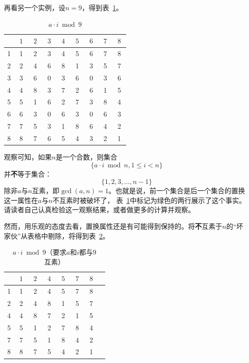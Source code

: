 再看另一个实例，设$n = 9$，得到表~\ref{tab:ai_mod_9}。
	\begin{table}[htbp]
		\centering
		\begin{tabular}{ | c | c | c | c | c | c | c | c | c | }
			\hline
			\diagbox{$a$}{$a \cdot i \;$}{$i \;$}  & $\; 1 \;$ & $\; 2 \;$ & $\; 3 \;$ & $\; 4 \;$ & $\; 5 \;$ & $\; 6 \;$ & $\; 7 \;$ & $\; 8 \;$  \\ \hline
			1 & 1 & 2 & 3 & 4 & 5 & 6 & 7 & 8 \\ \hline
			2 & 2 & 4 & 6 & 8 & 1  & 3 & 5 & 7 \\ \hline
			\rowcolor{green}  3 & 3 & 6 & 0 & 3 & 6 & 0 & 3 & 6 \\ \hline
			4 & 4 & 8 & 3 & 7 & 2 & 6 & 1 & 5 \\ \hline
			5 & 5 & 1 & 6  & 2  & 7 & 3 & 8 & 4 \\ \hline
			\rowcolor{green}  6 & 6 & 3 & 0 & 6 & 3 & 0 & 6 & 3 \\ \hline
			7 & 7 & 5 & 3 & 1 & 8 & 6 & 4 & 2 \\ \hline
			8 & 8 & 7  & 6  & 5  & 4 & 3 & 2 & 1 \\
			\hline
		\end{tabular}
		\caption{$a \cdot i \bmod 9$}
		\label{tab:ai_mod_9}
	\end{table}

观察可知，如果$n$是一个合数，则集合
\[\{ a \cdot i \bmod n, 1 \leq i < n \}\]
并\textbf{不}等于集合：
\[\{1, 2, 3, \ldots, n-1\}\]
除非$a$与$n$互素，即$\gcd(a,n)=1$。也就是说，前一个集合是后一个集合的置换这一属性在$a$与$n$不互素时被破坏了，
表~\ref{tab:ai_mod_9}中标记为绿色的两行展示了这个事实。请读者自己认真检验这一观察结果，或者做更多的计算并观察。

然而，用乐观的态度去看，置换属性还是有可能得到保持的。将\textbf{不}互素于$n$的“坏家伙”从表格中剔除，将得到表~\ref{tab:ai_mod_9_2}。

	\begin{table}[htbp]
		\centering
		\begin{tabular}{ | c | c | c | c | c | c | c | c | }
			\hline
			\diagbox{$a$}{$a \cdot i \;$}{$i \;$}  & $\; 1 \;$ & $\; 2 \;$  & $\; 4 \;$ & $\; 5 \;$ & $\; 7 \;$ & $\; 8 \;$  \\ \hline
			1 & 1 & 2 & 4 & 5 & 7 & 8 \\ \hline
			2 & 2 & 4 & 8 & 1 & 5 & 7 \\ \hline
			4 & 4 & 8 & 7 & 2 & 1 & 5 \\ \hline
			5 & 5 & 1 & 2 & 7 & 8 & 4 \\ \hline
			7 & 7 & 5 & 1 & 8 & 4 & 2 \\ \hline
			8 & 8 & 7 & 5  & 4 & 2 & 1 \\
			\hline
		\end{tabular}
		\caption{$a \cdot i \bmod 9$（要求$a$和$i$都与$9$互素）}
		\label{tab:ai_mod_9_2}
  \end{table}

